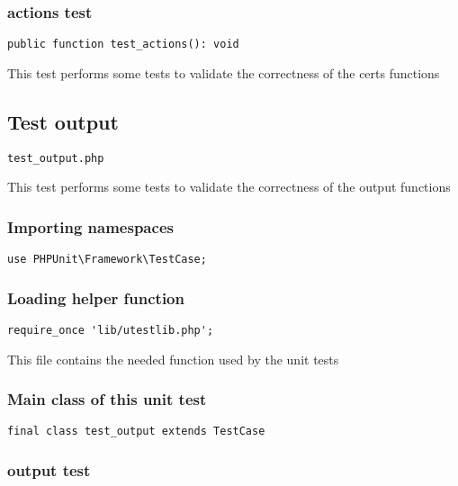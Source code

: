 \documentclass[a4paper]{article}
\begin{document}
\subsubsection{actions test}

\begin{lstlisting}
public function test_actions(): void
\end{lstlisting}

This test performs some tests to validate the correctness
of the certs functions

\hypertarget{toc279}{}
\subsection{Test output}

\begin{lstlisting}
test_output.php
\end{lstlisting}

This test performs some tests to validate the correctness
of the output functions

\hypertarget{toc280}{}
\subsubsection{Importing namespaces}

\begin{lstlisting}
use PHPUnit\Framework\TestCase;
\end{lstlisting}

\hypertarget{toc281}{}
\subsubsection{Loading helper function}

\begin{lstlisting}
require_once 'lib/utestlib.php';
\end{lstlisting}

This file contains the needed function used by the unit tests

\hypertarget{toc282}{}
\subsubsection{Main class of this unit test}

\begin{lstlisting}
final class test_output extends TestCase
\end{lstlisting}

\hypertarget{toc283}{}
\subsubsection{output test}
\end{document}
